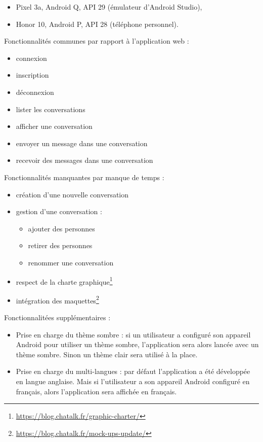 \begin{itemize}
\item
  Pixel 3a, Android Q, API 29 (émulateur d'Android Studio),
\item
  Honor 10, Android P, API 28 (téléphone personnel).
\end{itemize}

Fonctionnalités communes par rapport à l'application web :

\begin{itemize}
\item
  connexion
\item
  inscription
\item
  déconnexion
\item
  lister les conversations
\item
  afficher une conversation
\item
  envoyer un message dans une conversation
\item
  recevoir des messages dans une conversation
\end{itemize}

Fonctionnalités manquantes par manque de temps :

\begin{itemize}
\item
  création d'une nouvelle conversation
\item
  gestion d'une conversation :

  \begin{itemize}
  \item
    ajouter des personnes
  \item
    retirer des personnes
  \item
    renommer une conversation
  \end{itemize}
\item
  respect de la charte graphique\footnote{
    \url{https://blog.chatalk.fr/graphic-charter/}}
\item
  intégration des maquettes\footnote{
    \url{https://blog.chatalk.fr/mock-ups-update/}}
\end{itemize}

Fonctionnalitées supplémentaires :

\begin{itemize}
\item
  Prise en charge du thème sombre : si un utilisateur a configuré son
  appareil Android pour utiliser un thème sombre, l'application sera
  alors lancée avec un thème sombre. Sinon un thème clair sera utilisé à
  la place.
\item
  Prise en charge du multi-langues : par défaut l'application a été
  développée en langue anglaise. Mais si l'utilisateur a son appareil
  Android configuré en français, alors l'application sera affichée en
  français.
\end{itemize}

